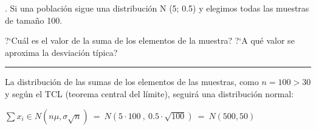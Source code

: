 \vspace{4mm}%
\begin{example}
.	Si una población sigue una distribución N (5; 0.5) y elegimos todas las muestras de tamaño 100.

 \vspace{2mm} ?`Cuál es el valor de la suma de los elementos de la muestra?
 ?`A qué valor se aproxima la desviación típica?


\rule{150pt}{0.1pt}

La distribución de las sumas de los elementos de las muestras, como $n=100>30$ y según el TCL (teorema central del límite), seguirá una distribución normal:

$\sum x_i \in N(n\mu , \sigma \sqrt{n}) \ = \ N(5 \cdot 100 \ , \  0.5 \cdot \sqrt{100}) \ = \ N(500,50)$
\end{example}

